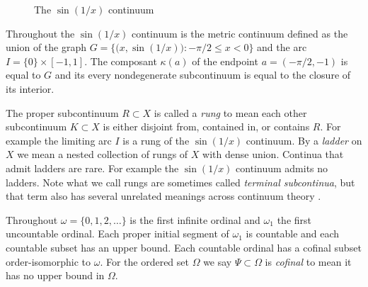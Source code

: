 \documentclass[12pt]{article}
\theoremstyle{plain}
\theoremstyle{definition}
\newcommand{\A}{\ensuremath{\alpha}}
\newcommand{\K}{\ensuremath{\kappa}}
\newcommand{\B}{\ensuremath{\beta}}
\newcommand{\si}{\ensuremath{\sigma}}
\newcommand{\W}{\ensuremath{\omega}}
\newcommand{\WW}{\ensuremath{\Omega}}
\newcommand{\G}{\ensuremath{\gamma}}
\newcommand{\0}{\ensuremath{\varnothing}}
\begin{document}
	
	\begin{figure}[!h]
		\centering
		\caption{The $\sin(1/x)$ continuum}\label{SinContinuum}
	\end{figure}
	
	
	
	
	Throughout the $\sin(1/x)$ continuum is the metric continuum defined as the union of the graph 
	$G =  \big \{ \big (x,\sin(1/x) \big ): -\pi/2 \le x < 0 \big \}$ and the arc $I = \{0\} \times [-1,1]$.
	The composant $\K(a)$ of the endpoint $a = (-\pi/2,-1)$ is equal to $G$ and its every nondegenerate subcontinuum is equal to the closure of its interior.
	
	
	The proper subcontinuum $R \subset X$ is called a \textit{rung} to mean each other subcontinuum $K \subset X$ 
	is either disjoint from, contained in, or contains $R$.
	For example the limiting arc $I$ is a rung of the $\sin(1/x)$ continuum.
	By a \textit{ladder} on $X$ we mean a nested collection of rungs of $X$ with dense union.
	Continua that admit ladders are rare.
	For example the $\sin(1/x)$ continuum admits no ladders.
	Note what we call rungs are sometimes called \textit{terminal subcontinua}, 
	but that term also has several unrelated meanings across continuum theory \cite{TerminalContinua}.
	
	
	
	Throughout %
	$\W = \{0,1,2, \ldots\}$ is the first infinite ordinal and $\W_1$ the first uncountable ordinal.
	Each proper initial segment of $\W_1$ is countable and each countable subset has an upper bound.
	Each countable ordinal has a cofinal subset order-isomorphic to $\W$.
	For the ordered set $\WW$ we say $\Psi \subset \WW$ is \textit{cofinal} to mean it has no upper bound in $\WW$.
	
\end{document}
